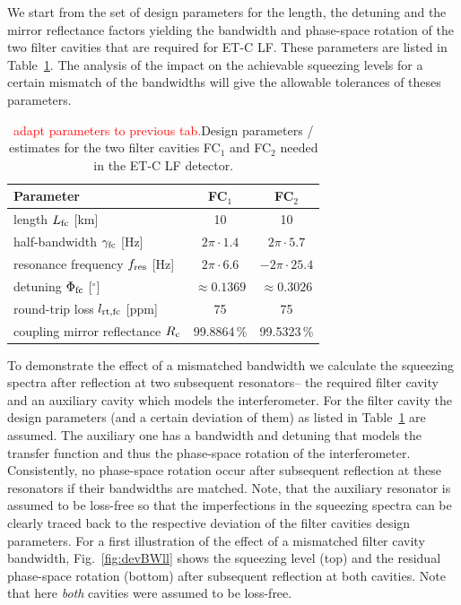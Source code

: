 We start from the set of design parameters for the length, the detuning and the mirror reflectance factors yielding the bandwidth and phase-space rotation of the two filter cavities that are required for ET-C LF. These parameters are listed  in Table~\ref{tab:designparams}. The analysis of the impact on the achievable squeezing levels for a certain mismatch of the bandwidths will give the allowable tolerances of theses parameters.
\begin{table}[h]
\begin{center}
\begin{tabular}{lcc}
\hline
\hline
Parameter & FC$_1$ & FC$_2$\\
\hline
length $L_{\rm fc}$ [km] & 10 & 10\\
half-bandwidth $\gamma_{\rm fc}$ [Hz] & $2\pi\cdot1.4$ & $2\pi\cdot5.7$\\
resonance frequency  $f_{\rm res}$ [Hz] &  $2\pi\cdot6.6$ & $-2\pi\cdot25.4$\\
detuning $\Phi_{\rm fc}$ [$^\circ$] & $\approx 0.1369$ & $\approx 0.3026$\\
round-trip loss $l_{\rm rt,fc}$  [ppm] &75  & 75\\
coupling mirror reflectance $R_{\rm c}$ & 99.8864\,\% & 99.5323\,\%\\
\hline
\hline
\end{tabular}
\end{center}
\caption{\textcolor{red}{adapt parameters to previous tab.}Design parameters / estimates for the two filter cavities FC$_1$ and FC$_2$ needed in the ET-C LF detector.}
\label{tab:designparams}
\end{table}


To demonstrate the effect of a mismatched bandwidth we calculate the squeezing spectra after reflection at two subsequent resonators-- the required filter cavity and an auxiliary cavity which models the interferometer. For the filter cavity the design parameters (and a certain deviation of them) as listed in Table~\ref{tab:designparams} are assumed. The auxiliary one has a bandwidth and detuning  that models the transfer function and thus the phase-space rotation of the interferometer.  Consistently,  no phase-space rotation occur after subsequent reflection at these resonators if their bandwidths are matched.   Note, that  the auxiliary resonator is assumed to be loss-free so that the imperfections in the squeezing spectra can be clearly traced back to the respective deviation of the filter cavities design parameters. For a first illustration of the effect of a mismatched filter cavity bandwidth, Fig.~\ref{fig:devBWll} shows the squeezing level (top) and the residual phase-space rotation (bottom) after subsequent  reflection at both cavities. Note that here  \emph{both} cavities  were assumed to be loss-free.



